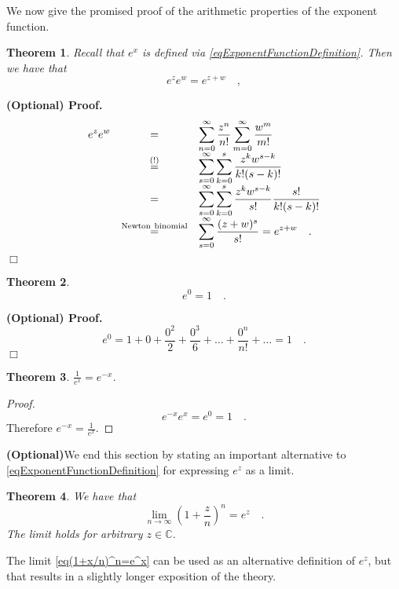 \documentclass[12pt]{book}
\newcommand{\eqAttention}{\stackrel{(!)}{=}}
\newcommand{\importantFormula}[1]{\begin{equation} \boxed{#1} \end{equation}}
\newenvironment{proofOptional}[1][]{ \noindent \textbf{(Optional) Proof#1.}}{$\Box$\medskip}
\newtheorem{theorem}{Theorem}[section]
\newcommand{\optionalMaterial}{\textbf{(Optional)}}
\begin{document}
We now give the promised proof of the arithmetic properties of the exponent function.
\begin{theorem}\label{thExponentArgumentsAddWhenMultiplying}
Recall that $e^x$ is defined via \eqref{eqExponentFunctionDefinition}. Then we have that \importantFormula{
e^{z} e^{w}=e^{z+w}\quad ,
}
\end{theorem}
\begin{proofOptional}
\[
\begin{array}{rcl}
\displaystyle
\displaystyle e^{z} e^w&=&\displaystyle  \sum_{n=0}^{\infty} \frac{z^n}{n!} \sum_{m=0}^{\infty} \frac{w^m}{m!} \\ &\eqAttention&  \displaystyle  \sum_{s=0}^{\infty}\sum_{k=0 }^s \frac{z^{k}w^{s-k}}{k! (s-k)!} \\ &=& \displaystyle  \sum_{s=0}^{\infty}\sum_{k=0 }^s   \frac{z^{k}w^{s-k}}{s!} \frac{s!}{k! (s-k)!}\\ &\stackrel{\mathrm{Newton~binomial}}{=}& \displaystyle  \sum_{s=0}^{\infty} \frac{(z+w)^s}{s!}=e^{z+w}\quad .
\end{array}
\]
\end{proofOptional}
\begin{theorem}
\[
e^0=1\quad .
\]
\end{theorem}
\begin{proofOptional}
\[ e^0 = 1+ 0+ \frac{0^2}{2}+ \frac{0^3}{6}+\dots +\frac{0^n}{n!}+\dots = 1\quad .
\]
\end{proofOptional}

\begin{theorem}
$\frac{1}{e^{x}}= e^{-x}$\quad .
\end{theorem}
\begin{proof}
\[e^{-x}e^x=e^0 = 1\quad .
\]
Therefore $e^{-x}=\frac{1}{e^x}.$
\end{proof}

\optionalMaterial We end this section by stating an important alternative to \ref{eqExponentFunctionDefinition} for expressing $e^z$ as a limit.
\begin{theorem}\label{th(1+x/n)^n=e^x}
We have that
\begin{equation}\label{eq(1+x/n)^n=e^x}
\lim_{n\to \infty} \left(1+\frac{z}n\right)^n= e^z\quad .
\end{equation}
The limit holds for arbitrary $z\in \mathbb C$.
\end{theorem}
The limit \eqref{eq(1+x/n)^n=e^x} can be used as an alternative definition of $e^{z}$, but that results in a slightly longer exposition of the theory.
\end{document}
